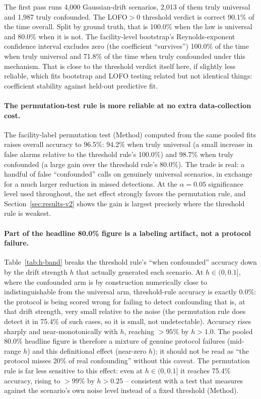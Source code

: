 \documentclass[journal=dce]{CUP-JNL-DTM}%
\begin{document}
The first pass runs 4,000 Gaussian-drift scenarios, 2,013 of them truly universal and 1,987 truly confounded. The LOFO$>0$ threshold verdict is correct 90.1\% of the time overall. Split by ground truth, that is 100.0\% when the law is universal and 80.0\% when it is not. The facility-level bootstrap's Reynolds-exponent confidence interval excludes zero (the coefficient ``survives'') 100.0\% of the time when truly universal and 71.8\% of the time when truly confounded under this mechanism. That is close to the threshold verdict itself here, if slightly less reliable, which fits bootstrap and LOFO testing related but not identical things: coefficient stability against held-out predictive fit.

\paragraph{The permutation-test rule is more reliable at no extra data-collection cost.} The facility-label permutation test (Method) computed from the same pooled fits raises overall accuracy to 96.5\%: 94.2\% when truly universal (a small increase in false alarms relative to the threshold rule's 100.0\%) and 98.7\% when truly confounded (a large gain over the threshold rule's 80.0\%). The trade is real: a handful of false ``confounded'' calls on genuinely universal scenarios, in exchange for a much larger reduction in missed detections. At the $\alpha=0.05$ significance level used throughout, the net effect strongly favors the permutation rule, and Section~\ref{sec:results-v2} shows the gain is largest precisely where the threshold rule is weakest.

\paragraph{Part of the headline 80.0\% figure is a labeling artifact, not a protocol failure.} Table~\ref{tab:h-band} breaks the threshold rule's ``when confounded'' accuracy down by the drift strength $h$ that actually generated each scenario. At $h\in(0,0.1]$, where the confounded arm is by construction numerically close to indistinguishable from the universal arm, threshold-rule accuracy is exactly 0.0\%: the protocol is being scored wrong for failing to detect confounding that is, at that drift strength, very small relative to the noise (the permutation rule does detect it in 75.4\% of such cases, so it is small, not undetectable). Accuracy rises sharply and near-monotonically with $h$, reaching $>95\%$ by $h>1.0$. The pooled 80.0\% headline figure is therefore a mixture of genuine protocol failures (mid-range $h$) and this definitional effect (near-zero $h$); it should not be read as ``the protocol misses 20\% of real confounding'' without this caveat. The permutation rule is far less sensitive to this effect: even at $h\in(0,0.1]$ it reaches 75.4\% accuracy, rising to $>99\%$ by $h>0.25$ -- consistent with a test that measures against the scenario's own noise level instead of a fixed threshold (Method).
\end{document}
